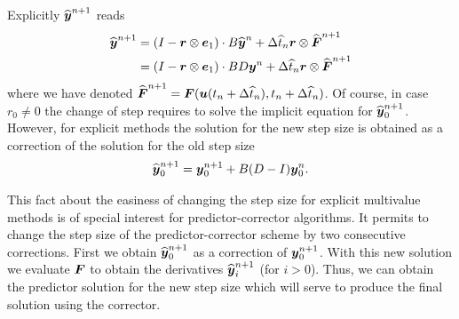 Explicitly $\widehat{\boldsymbol{y}}^{n+1}$ reads
%
\begin{align}
	\widehat{\boldsymbol{y}}^{n+1}
	&
	=
	\left(
	I
	-
	\boldsymbol{r}
	\otimes 
	\boldsymbol{e}_{1}
	\right)
	\cdot
	B
	\widehat{\boldsymbol{y}}^{n}
	+
	\Delta \widehat{t}_n
	\boldsymbol{r}
	\otimes 
	\widehat{\boldsymbol{F}}^{n+1}
	\nonumber\\
	&
	=
	\left(
	I
	-
	\boldsymbol{r}
	\otimes 
	\boldsymbol{e}_{1}
	\right)
	\cdot
	B D
	{\boldsymbol{y}}^{n}
	+
	\Delta \widehat{t}_n
	\boldsymbol{r}
	\otimes 
	\widehat{\boldsymbol{F}}^{n+1}
\end{align}
where we have denoted $\widehat{\boldsymbol{F}}^{n+1}=\boldsymbol{F}(\boldsymbol{u}(t_n + \Delta \widehat{t}_n), t_n + \Delta \widehat{t}_n)$. Of course, in case $r_0\ne 0$ the change of step requires to solve the implicit equation for $\widehat{\boldsymbol{y}}_0^{n+1}$. However, for explicit methods the solution for the new step size is obtained as a correction of the solution for the old step size
%
\begin{align}
	\widehat{\boldsymbol{y}}_0^{n+1} = {\boldsymbol{y}}_0^{n+1} + B(D-I){\boldsymbol{y}}_0^{n}.
\end{align}

This fact about the easiness of changing the step size for explicit multivalue methods is of special interest for predictor-corrector algorithms. It permits to change the step size of the predictor-corrector scheme by two consecutive corrections. First we obtain $\widehat{\boldsymbol{y}}_0^{n+1}$ as a correction of ${\boldsymbol{y}}_0^{n+1}$. With this new solution we evaluate $\boldsymbol{F}$ to obtain the derivatives $\widehat{\boldsymbol{y}}_i^{n+1}$ (for $i>0$). Thus, we can obtain the predictor solution for the new step size which will serve to produce the final solution using the corrector. 
